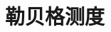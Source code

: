 \documentclass[../main.tex]{subfiles} %
\begin{document}
\chapter{勒贝格测度}



% 

% 

% 

% 

% 

% 

% 

% 

% 
\end{document}
